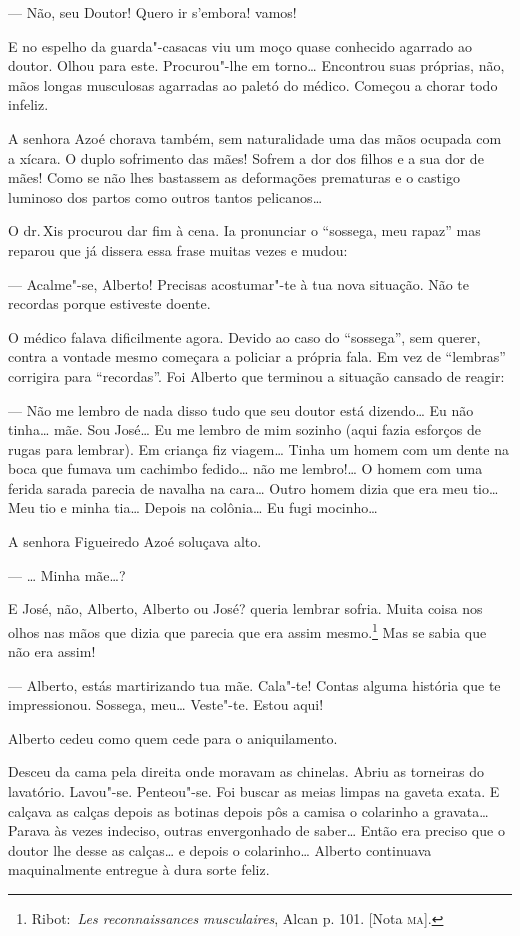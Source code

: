 \begin{linenumbers}
--- Não, seu Doutor! Quero ir s'embora! vamos!

E no espelho da guarda"-casacas viu um moço quase conhecido agarrado ao
doutor. Olhou para este. Procurou"-lhe em torno\ldots{} Encontrou suas
próprias, não, mãos longas musculosas agarradas ao paletó do médico.
Começou a chorar todo infeliz.

A senhora Azoé chorava também, sem naturalidade uma das mãos ocupada com
a xícara. O duplo sofrimento das mães! Sofrem a dor dos filhos e a sua
dor de mães! Como se não lhes bastassem as deformações prematuras e o
castigo luminoso dos partos como outros tantos pelicanos\ldots{}

O dr.\,Xis procurou dar fim à cena. Ia pronunciar o ``sossega, meu
rapaz'' mas reparou que já dissera essa frase muitas vezes e mudou:

--- Acalme"-se, Alberto! Precisas acostumar"-te à tua nova situação. Não
te recordas porque estiveste doente.

O médico falava dificilmente agora. Devido ao caso do ``sossega'', sem
querer, contra a vontade mesmo começara a policiar a própria fala. Em
vez de ``lembras'' corrigira para ``recordas''. Foi Alberto que terminou
a situação cansado de reagir:

--- Não me lembro de nada disso tudo que seu doutor está dizendo\ldots{} Eu
não tinha\ldots{} mãe. Sou José\ldots{} Eu me lembro de mim sozinho (aqui fazia
esforços de rugas para lembrar). Em criança fiz viagem\ldots{} Tinha um homem
com um dente na boca que fumava um cachimbo fedido\ldots{} não me lembro!\ldots{}
O homem com uma ferida sarada parecia de navalha na cara\ldots{} Outro homem
dizia que era meu tio\ldots{} Meu tio e minha tia\ldots{} Depois na colônia\ldots{} Eu
fugi mocinho\ldots{}

A senhora Figueiredo Azoé soluçava alto.

--- \ldots{} Minha mãe\ldots{}?

E José, não, Alberto, Alberto ou José? queria lembrar sofria. Muita
coisa nos olhos nas mãos que dizia que parecia que era assim
mesmo.\footnote{Ribot:~\emph{Les reconnaissances musculaires}, Alcan p.
  101. {[}Nota \textsc{ma}{]}.} Mas se sabia que não era assim!

--- Alberto, estás martirizando tua mãe. Cala"-te! Contas alguma história
que te impressionou. Sossega, meu\ldots{} Veste"-te. Estou aqui!

Alberto cedeu como quem cede para o aniquilamento.

Desceu da cama pela direita onde moravam as chinelas. Abriu as torneiras
do lavatório. Lavou"-se. Penteou"-se. Foi buscar as meias limpas na gaveta
exata. E calçava as calças depois as botinas depois pôs a camisa o
colarinho a gravata\ldots{} Parava às vezes indeciso, outras envergonhado de
saber\ldots{} Então era preciso que o doutor lhe desse as calças\ldots{} e depois
o colarinho\ldots{} Alberto continuava maquinalmente entregue à dura sorte
feliz.


\end{linenumbers}
